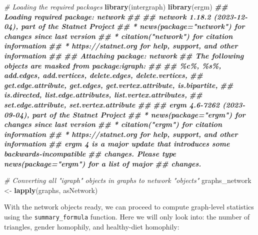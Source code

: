 \documentclass[
]{book}
\newenvironment{Shaded}{\begin{snugshade}}{\end{snugshade}}
\newcommand{\CommentTok}[1]{\textcolor[rgb]{0.56,0.35,0.01}{\textit{#1}}}
\newcommand{\DocumentationTok}[1]{\textcolor[rgb]{0.56,0.35,0.01}{\textbf{\textit{#1}}}}
\newcommand{\FunctionTok}[1]{\textcolor[rgb]{0.13,0.29,0.53}{\textbf{#1}}}
\newcommand{\NormalTok}[1]{#1}
\newcommand{\OtherTok}[1]{\textcolor[rgb]{0.56,0.35,0.01}{#1}}
\begin{document}
\begin{Shaded}
\begin{Highlighting}[]
\CommentTok{\# Loading the required packages}
\FunctionTok{library}\NormalTok{(intergraph)}
\FunctionTok{library}\NormalTok{(ergm)}
\DocumentationTok{\#\# Loading required package: network}
\DocumentationTok{\#\# }
\DocumentationTok{\#\# \textquotesingle{}network\textquotesingle{} 1.18.2 (2023{-}12{-}04), part of the Statnet Project}
\DocumentationTok{\#\# * \textquotesingle{}news(package="network")\textquotesingle{} for changes since last version}
\DocumentationTok{\#\# * \textquotesingle{}citation("network")\textquotesingle{} for citation information}
\DocumentationTok{\#\# * \textquotesingle{}https://statnet.org\textquotesingle{} for help, support, and other information}
\DocumentationTok{\#\# }
\DocumentationTok{\#\# Attaching package: \textquotesingle{}network\textquotesingle{}}
\DocumentationTok{\#\# The following objects are masked from \textquotesingle{}package:igraph\textquotesingle{}:}
\DocumentationTok{\#\# }
\DocumentationTok{\#\#     \%c\%, \%s\%, add.edges, add.vertices, delete.edges, delete.vertices,}
\DocumentationTok{\#\#     get.edge.attribute, get.edges, get.vertex.attribute, is.bipartite,}
\DocumentationTok{\#\#     is.directed, list.edge.attributes, list.vertex.attributes,}
\DocumentationTok{\#\#     set.edge.attribute, set.vertex.attribute}
\DocumentationTok{\#\# }
\DocumentationTok{\#\# \textquotesingle{}ergm\textquotesingle{} 4.6{-}7262 (2023{-}09{-}04), part of the Statnet Project}
\DocumentationTok{\#\# * \textquotesingle{}news(package="ergm")\textquotesingle{} for changes since last version}
\DocumentationTok{\#\# * \textquotesingle{}citation("ergm")\textquotesingle{} for citation information}
\DocumentationTok{\#\# * \textquotesingle{}https://statnet.org\textquotesingle{} for help, support, and other information}
\DocumentationTok{\#\# \textquotesingle{}ergm\textquotesingle{} 4 is a major update that introduces some backwards{-}incompatible}
\DocumentationTok{\#\# changes. Please type \textquotesingle{}news(package="ergm")\textquotesingle{} for a list of major}
\DocumentationTok{\#\# changes.}

\CommentTok{\# Converting all "igraph" objects in graphs to network "objects"}
\NormalTok{graphs\_network }\OtherTok{\textless{}{-}} \FunctionTok{lapply}\NormalTok{(graphs, asNetwork)}
\end{Highlighting}
\end{Shaded}

With the network objects ready, we can proceed to compute graph-level statistics using the \texttt{summary\_formula} function. Here we will only look into: the number of triangles, gender homophily, and healthy-diet homophily:
\end{document}
